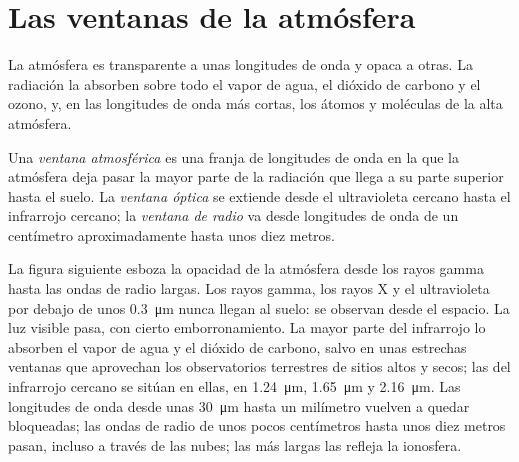 \section{Las ventanas de la atmósfera}

La atmósfera es transparente a unas longitudes de onda y opaca a otras. La radiación
la absorben sobre todo el vapor de agua, el dióxido de carbono y el ozono, y, en las
longitudes de onda más cortas, los átomos y moléculas de la alta atmósfera.

\begin{definition}\label{def:b1:observing-the-sky:window}
Una \emph{ventana atmosférica} es una franja de longitudes
de onda en la que la atmósfera deja pasar la mayor parte de la radiación que llega a
su parte superior hasta el suelo. La \emph{ventana óptica} se
extiende desde el ultravioleta cercano hasta el infrarrojo cercano; la
\emph{ventana de radio} va desde longitudes de onda de un
centímetro aproximadamente hasta unos diez metros.
\end{definition}

La figura siguiente esboza la opacidad de la atmósfera desde los rayos gamma hasta las
ondas de radio largas. Los rayos gamma, los rayos X y el ultravioleta por debajo de
unos \qty{0.3}{\micro\metre} nunca llegan al suelo: se observan desde el espacio. La
luz visible pasa, con cierto emborronamiento. La mayor parte del infrarrojo lo absorben
el vapor de agua y el dióxido de carbono, salvo en unas estrechas ventanas que
aprovechan los observatorios terrestres de sitios altos y secos; las  del infrarrojo cercano se sitúan en ellas, en \qty{1.24}{\micro\metre},
\qty{1.65}{\micro\metre} y \qty{2.16}{\micro\metre}. Las longitudes de onda desde unas
\qty{30}{\micro\metre} hasta un milímetro vuelven a quedar bloqueadas; las ondas de
radio de unos pocos centímetros hasta unos diez metros pasan, incluso a través de las
nubes; las más largas las refleja la ionosfera.

